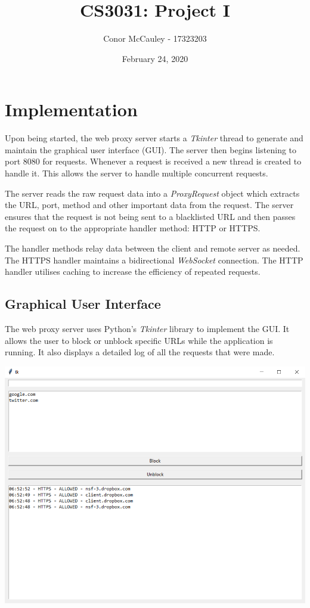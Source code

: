 \documentclass[12pt]{article}
\title{CS3031: Project I}
\author{Conor McCauley - 17323203}
\date{February 24, 2020}
\begin{document}
\maketitle

\section{Implementation}

\noindent Upon being started, the web proxy server starts a {\it Tkinter} thread to generate and maintain the graphical user interface (GUI). The server then begins listening to port $8080$ for requests. Whenever a request is received a new thread is created to handle it. This allows the server to handle multiple concurrent requests.

\indent The server reads the raw request data into a {\it ProxyRequest} object which extracts the URL, port, method and other important data from the request. The server ensures that the request is not being sent to a blacklisted URL and then passes the request on to the appropriate handler method: HTTP or HTTPS.

\indent The handler methods relay data between the client and remote server as needed. The HTTPS handler maintains a bidirectional {\it WebSocket} connection. The HTTP handler utilises caching to increase the efficiency of repeated requests.

\subsection{Graphical User Interface}

\noindent The web proxy server uses Python's {\it Tkinter} library to implement the GUI. It allows the user to block or unblock specific URLs while the application is running. It also displays a detailed log of all the requests that were made.

\begin{center}
\includegraphics[scale=0.6]{gui.png}
\end{center}
\end{document}
